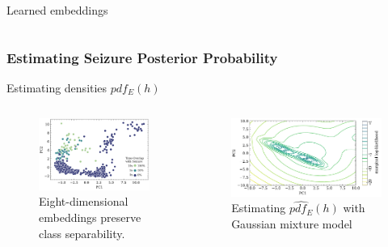 \documentclass[t]{beamer}
\theoremstyle{definition}
\begin{document}
\begin{frame}{Learned embeddings}
\begin{columns}
    \end{columns}

\end{frame}


\subsubsection{Estimating Seizure Posterior Probability}

\begin{frame}{Estimating densities $pdf_E(h)$}
\begin{columns}[t]
    \begin{column}{0.382\textwidth}
       
    \begin{figure}
            \centering
            \includegraphics[width=\textwidth]{figs/embeddings_double.pdf}
            \caption{Eight-dimensional embeddings preserve class separability.}
            \label{fig:my_label}
        \end{figure}        
    \end{column}
    \begin{column}{0.618\textwidth}

    \begin{figure}
            \centering
            \includegraphics[width=\textwidth]{figs/de_pc1_pc2.pdf}
            \caption{Estimating $\hat{pdf_E}(h)$ with Gaussian mixture model}
            \label{fig:my_label}
        \end{figure}
        

\end{column}
\end{columns}
\end{frame}
\end{document}
